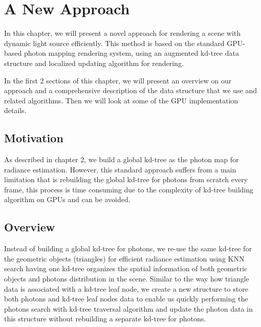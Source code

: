 \setcounter{figure}{0}

\chapter{A New Approach}

In this chapter, we will present a novel approach for rendering a scene with dynamic light source efficiently. This method is based on the standard GPU-based photon mapping rendering system, using an augmented kd-tree data structure and localized updating algorithm for rendering.

In the first 2 sections of this chapter, we will present an overview on our approach and a comprehensive description of the data structure that we use and related algorithms. Then we will look at some of the GPU implementation details.

\section{Motivation}
As described in chapter 2, we build a global kd-tree as the photon map for radiance estimation. However, this standard approach suffers from a main limitation that is rebuilding the global kd-tree for photons from scratch every frame, this process is time consuming due to the complexity of kd-tree building algorithm on GPUs and can be avoided.

\section{Overview}
Instead of building a global kd-tree for photons, we re-use the same kd-tree for the geometric objects (triangles) for efficient
radiance estimation using KNN search having one kd-tree organizes the spatial information of both geometric objects and photons distribution in the scene. Similar to the way how triangle data is associated with a kd-tree leaf node, we create a new structure to store both photons and kd-tree leaf nodes data to enable us quickly performing the photons search with kd-tree traversal algorithm   and update the photon data in this structure without rebuilding a separate kd-tree for photons.


